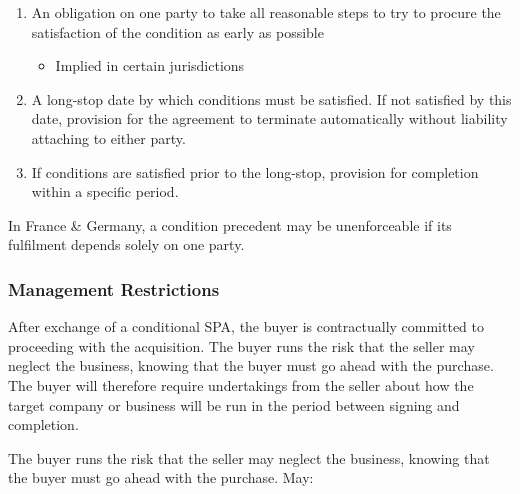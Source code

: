 \documentclass[
]{article}
\providecommand{\tightlist}{%
  \setlength{\itemsep}{0pt}\setlength{\parskip}{0pt}}
\begin{document}
\begin{enumerate}
\tightlist
\item
  An obligation on one party to take all reasonable steps to try to
  procure the satisfaction of the condition as early as possible

  \begin{itemize}
  \tightlist
  \item
    Implied in certain jurisdictions
  \end{itemize}
\item
  A long-stop date by which conditions must be satisfied. If not
  satisfied by this date, provision for the agreement to terminate
  automatically without liability attaching to either party.
\item
  If conditions are satisfied prior to the long-stop, provision for
  completion within a specific period.
\end{enumerate}

In France \& Germany, a condition precedent may be unenforceable if its
fulfilment depends solely on one party.

\hypertarget{management-restrictions}{%
\subsubsection{Management Restrictions}\label{management-restrictions}}

After exchange of a conditional SPA, the buyer is contractually
committed to proceeding with the acquisition. The buyer runs the risk
that the seller may neglect the business, knowing that the buyer must go
ahead with the purchase. The buyer will therefore require undertakings
from the seller about how the target company or business will be run in
the period between signing and completion.

The buyer runs the risk that the seller may neglect the business,
knowing that the buyer must go ahead with the purchase. May:
\end{document}
